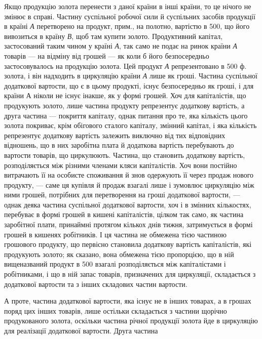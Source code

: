 Якщо продукцію золота перенести з даної країни в інші країни, то
це нічого не змінює в справі. Частину суспільної робочої сили й суспільних
засобів продукції в країні \emph{А} перетворено на продукт, прим., на
полотно, вартістю в 500, що його вивозиться в країну \emph{В}, щоб
там купити золото. Продуктивний капітал, застосований таким чином у
країні \emph{А}, так само не подає на ринок країни \emph{А} товарів — на відміну
від грошей — як коли б його безпосередньо застосовувалось на продукцію
золота. Цей продукт \emph{А} репрезентовано в 500 ф. золота, і він
надходить в циркуляцію країни \emph{А} лише як гроші. Частина суспільної
додаткової вартости, що є в цьому продукті, існує безпосередньо як
гроші, і для країни А ніколи не існує інакше, як у формі грошей. Хоч
для капіталістів, що продукують золото, лише частина продукту репрезентує
додаткову вартість, а друга частина — покриття капіталу, однак питання
про те, яка кількість цього золота покриває, крім обігового сталого
капіталу, змінний капітал, і яка кількість репрезентує додаткову
вартість залежить виключно від тих відповідних відношень,
що в них заробітна плата й додаткова вартість перебувають до
вартости товарів, що циркулюють. Частина, що становить додаткову
вартість, розподіляється між різними членами кляси капіталістів. Хоч
вони постійно витрачають її на особисте споживання й знов одержують
її через продаж нового продукту, — саме ця купівля й продаж взагалі
лише і зумовлює циркуляцію між ними грошей, потрібних для перетворення
на гроші додаткової вартости, — однак деяка частина суспільної
додаткової вартости, хоч і в змінних кількостях, перебуває в формі
грошей в кишені капіталістів, цілком так само, як частина заробітної
плати, принаймні протягом кількох днів тижня, затримується в формі грошей
в кишенях робітників. І ця частина не обмежена тією частиною грошового
продукту, що первісно становила додаткову вартість капіталістів, які
продукують золото; як сказано, вона обмежена тією пропорцією, що в
ній вищеназваний продукт в 500 взагалі розподіляється між
капіталістами і робітниками, і що в ній запас товарів, призначених для
циркуляції, складається з додаткової вартости та з інших складових частин
вартости.

А проте, частина додаткової вартости, яка існує не в інших товарах,
а в грошах поряд цих інших товарів, лише остільки складається з частини
щорічно продукованого золота, оскільки частина річної продукції золота
йде в циркуляцію для реалізації додаткової вартости. Друга частина
\parbreak{}  %
